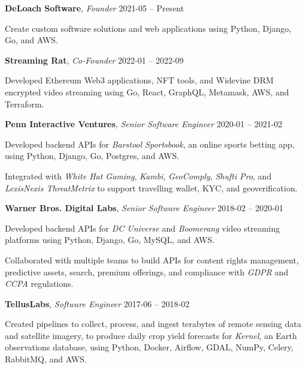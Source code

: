 \documentclass[12pt,a4paper]{article}
\newcommand{\workhead}[3]{\textbf{#1}, \emph{#2} \hfill #3}
\newcommand{\li}{\item[--]}
\begin{document}
\begin{description}[leftmargin=0em]
    \itemsep0pt
    \parskip3pt

    \item
        \workhead{DeLoach Software}{Founder}{2021-05 -- Present}
        \begin{itemize*}
            \li Create custom software solutions and web applications using Python, Django, Go, and AWS.
        \end{itemize*}

    \item
        \workhead{Streaming Rat}{Co-Founder}{2022-01 -- 2022-09}
        \begin{itemize*}
            \li Developed Ethereum Web3 applications, NFT tools, and Widevine DRM encrypted video streaming using Go, React, GraphQL, Metamask, AWS, and Terraform.
        \end{itemize*}

    \item
        \workhead{Penn Interactive Ventures}{Senior Software Engineer}{2020-01 -- 2021-02}
        \begin{itemize*}
            \li Developed backend APIs for \emph{Barstool Sportsbook}, an online sports betting app, using Python, Django, Go, Postgres, and AWS.
            \li Integrated with \emph{White Hat Gaming}, \emph{Kambi}, \emph{GeoComply}, \emph{Shufti Pro}, and \emph{LexisNexis ThreatMetrix} to support travelling wallet, KYC, and geoverification.
        \end{itemize*}

    \item
        \workhead{Warner Bros. Digital Labs}{Senior Software Engineer}{2018-02 -- 2020-01}
        \begin{itemize*}
            \li Developed backend APIs for \emph{DC Universe} and \emph{Boomerang} video streaming platforms using Python, Django, Go, MySQL, and AWS.
            \li Collaborated with multiple teams to build APIs for content rights management, predictive assets, search, premium offerings, and compliance with \emph{GDPR} and \emph{CCPA} regulations.
        \end{itemize*}

    \item
        \workhead{TellusLabs}{Software Engineer}{2017-06 -- 2018-02}
        \begin{itemize*}
            \li Created pipelines to collect, process, and ingest terabytes of remote sensing data and satellite imagery, to produce daily crop yield forecasts for \emph{Kernel}, an Earth observations database, using Python, Docker, Airflow, GDAL, NumPy, \mbox{Celery}, RabbitMQ, and AWS.
        \end{itemize*}


\end{description}
\end{document}
